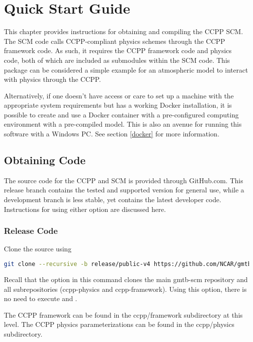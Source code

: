 \chapter{Quick Start Guide}
\label{chapter: quick}

This chapter provides instructions for obtaining and compiling the CCPP SCM. The SCM code calls CCPP-compliant physics schemes through the CCPP framework code. As such, it requires the CCPP framework code and physics code, both of which are included as submodules within the SCM code. This package can be considered a simple example for an atmospheric model to interact with physics through the CCPP. 

Alternatively, if one doesn't have access or care to set up a machine with the appropriate system requirements but has a working Docker installation, it is possible to create and use a Docker container with a pre-configured computing environment with a pre-compiled model. This is also an avenue for running this software with a Windows PC. See section \ref{docker} for more information.

\section{Obtaining Code}
\label{obtaining_code}

The source code for the CCPP and SCM is provided through GitHub.com.  This release branch contains the tested and supported version for general use, while a development branch is less stable, yet contains the latest developer code. Instructions for using either option are discussed here.

\subsection{Release Code}

Clone the source using
\begin{lstlisting}[language=bash]
git clone --recursive -b release/public-v4 https://github.com/NCAR/gmtb-scm
\end{lstlisting}
             Recall that the  option in this command clones the main gmtb-scm repository and all subrepositories (ccpp-physics and ccpp-framework). Using this option, there is no need to execute  and .

The CCPP framework can be found in the ccpp/framework subdirectory at this level.  The CCPP physics parameterizations can be found in the ccpp/physics subdirectory.

